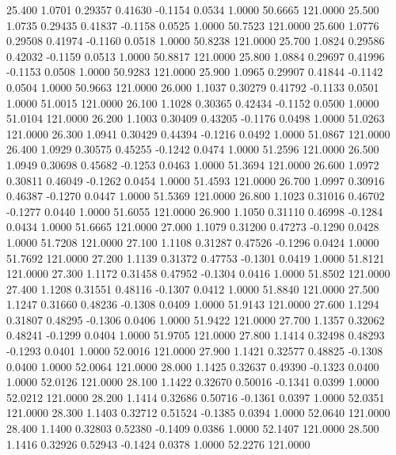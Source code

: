   25.400   1.0701   0.29357   0.41630  -0.1154   0.0534   1.0000  50.6665 121.0000
  25.500   1.0735   0.29435   0.41837  -0.1158   0.0525   1.0000  50.7523 121.0000
  25.600   1.0776   0.29508   0.41974  -0.1160   0.0518   1.0000  50.8238 121.0000
  25.700   1.0824   0.29586   0.42032  -0.1159   0.0513   1.0000  50.8817 121.0000
  25.800   1.0884   0.29697   0.41996  -0.1153   0.0508   1.0000  50.9283 121.0000
  25.900   1.0965   0.29907   0.41844  -0.1142   0.0504   1.0000  50.9663 121.0000
  26.000   1.1037   0.30279   0.41792  -0.1133   0.0501   1.0000  51.0015 121.0000
  26.100   1.1028   0.30365   0.42434  -0.1152   0.0500   1.0000  51.0104 121.0000
  26.200   1.1003   0.30409   0.43205  -0.1176   0.0498   1.0000  51.0263 121.0000
  26.300   1.0941   0.30429   0.44394  -0.1216   0.0492   1.0000  51.0867 121.0000
  26.400   1.0929   0.30575   0.45255  -0.1242   0.0474   1.0000  51.2596 121.0000
  26.500   1.0949   0.30698   0.45682  -0.1253   0.0463   1.0000  51.3694 121.0000
  26.600   1.0972   0.30811   0.46049  -0.1262   0.0454   1.0000  51.4593 121.0000
  26.700   1.0997   0.30916   0.46387  -0.1270   0.0447   1.0000  51.5369 121.0000
  26.800   1.1023   0.31016   0.46702  -0.1277   0.0440   1.0000  51.6055 121.0000
  26.900   1.1050   0.31110   0.46998  -0.1284   0.0434   1.0000  51.6665 121.0000
  27.000   1.1079   0.31200   0.47273  -0.1290   0.0428   1.0000  51.7208 121.0000
  27.100   1.1108   0.31287   0.47526  -0.1296   0.0424   1.0000  51.7692 121.0000
  27.200   1.1139   0.31372   0.47753  -0.1301   0.0419   1.0000  51.8121 121.0000
  27.300   1.1172   0.31458   0.47952  -0.1304   0.0416   1.0000  51.8502 121.0000
  27.400   1.1208   0.31551   0.48116  -0.1307   0.0412   1.0000  51.8840 121.0000
  27.500   1.1247   0.31660   0.48236  -0.1308   0.0409   1.0000  51.9143 121.0000
  27.600   1.1294   0.31807   0.48295  -0.1306   0.0406   1.0000  51.9422 121.0000
  27.700   1.1357   0.32062   0.48241  -0.1299   0.0404   1.0000  51.9705 121.0000
  27.800   1.1414   0.32498   0.48293  -0.1293   0.0401   1.0000  52.0016 121.0000
  27.900   1.1421   0.32577   0.48825  -0.1308   0.0400   1.0000  52.0064 121.0000
  28.000   1.1425   0.32637   0.49390  -0.1323   0.0400   1.0000  52.0126 121.0000
  28.100   1.1422   0.32670   0.50016  -0.1341   0.0399   1.0000  52.0212 121.0000
  28.200   1.1414   0.32686   0.50716  -0.1361   0.0397   1.0000  52.0351 121.0000
  28.300   1.1403   0.32712   0.51524  -0.1385   0.0394   1.0000  52.0640 121.0000
  28.400   1.1400   0.32803   0.52380  -0.1409   0.0386   1.0000  52.1407 121.0000
  28.500   1.1416   0.32926   0.52943  -0.1424   0.0378   1.0000  52.2276 121.0000

